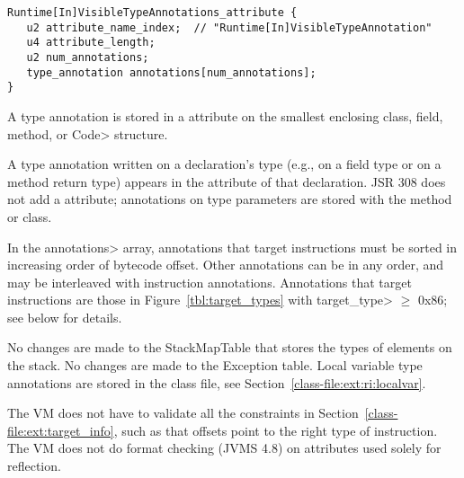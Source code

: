 \documentclass[10pt]{article}
\begin{document}
\preverbnegspace
\begin{Verbatim}
Runtime[In]VisibleTypeAnnotations_attribute {
   u2 attribute_name_index;  // "Runtime[In]VisibleTypeAnnotation"
   u4 attribute_length;
   u2 num_annotations;
   type_annotation annotations[num_annotations];
}
\end{Verbatim}


A type annotation is stored in a \RuntimeInOrVisibleTypeAnnotations attribute
on the smallest enclosing class, field, method, or \<Code> structure.

A type annotation written on a declaration's type (e.g., on a field type or
on a method return type)
appears in the \RuntimeInOrVisibleTypeAnnotations attribute of that declaration.
JSR 308 does not add a \RuntimeInOrVisibleTypeParameterAnnotations
attribute; annotations on type parameters are stored with the method or class.



In the \<annotations> array, annotations that target instructions must be
sorted in increasing order of bytecode offset.  Other annotations can be in
any order, and may be interleaved with instruction annotations.
Annotations that target instructions are those in
Figure~\ref{tbl:target_types} with \<target\_type> $\ge$ 0x86; see below
for details.

No changes are made to the StackMapTable that stores the types of elements
on the stack.
No changes are made to the Exception table.
Local variable type annotations are stored in the class file, see
Section~\ref{class-file:ext:ri:localvar}.

The VM does not have to validate all the constraints in
Section~\ref{class-file:ext:target_info}, such as that offsets point to the
right type of instruction.  The VM does not do format checking (JVMS 4.8)
on attributes used solely for reflection.
\end{document}

